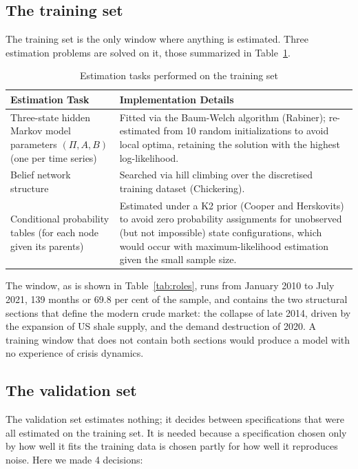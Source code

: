 \documentclass[11pt,a4paper]{article}
\begin{document}
\subsection{The training set}

The training set is the only window where anything is estimated. Three estimation problems are
solved on it, those summarized in Table~\ref{tab:training_tasks}.

\begin{table}[H]
\centering
\caption{Estimation tasks performed on the training set}
\label{tab:training_tasks}
\renewcommand{\arraystretch}{1.3}
\begin{tabular}{@{}p{3.5cm}p{\dimexpr\textwidth-3.5cm-2\tabcolsep\relax}@{}}
\toprule
\textbf{Estimation Task} & \textbf{Implementation Details} \\
\midrule
Three-state hidden Markov model parameters $(\Pi, A, B)$ (one per time series) & Fitted via the Baum-Welch algorithm (Rabiner); re-estimated from 10 random initializations to avoid local optima, retaining the solution with the highest log-likelihood. \\
\midrule
Belief network structure & Searched via hill climbing over the discretised training dataset (Chickering). \\
\midrule
Conditional probability tables (for each node given its parents) & Estimated under a K2 prior (Cooper and Herskovits) to avoid zero probability assignments for unobserved (but not impossible) state configurations, which would occur with maximum-likelihood estimation given the small sample size. \\
\bottomrule
\end{tabular}
\end{table}

The window, as is shown in Table~\ref{tab:roles}, runs from January 2010 to July 2021, 139 
months or 69.8 per cent of the sample, and
contains the two structural sections that define the modern crude market: the collapse 
of late 2014, driven by the expansion of US shale supply, and the demand destruction of 2020. 
A training window that does not contain both sections would produce a model with no 
experience of crisis dynamics.


\subsection{The validation set}

The validation set estimates nothing; it decides between specifications that were all estimated
on the training set. It is needed because a specification chosen only by how well it fits the
training data is chosen partly for how well it reproduces noise. Here we made 4 decisions:
\end{document}
